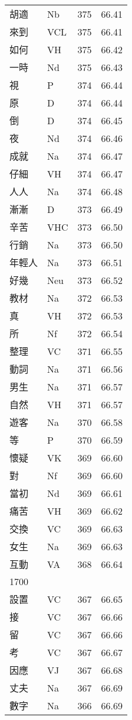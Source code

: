 \documentclass[twocolumn]{book}
\begin{document}
\begin{supertabular}{llrr}
胡適 & Nb & 375 &  66.41\\
來到 & VCL & 375 &  66.41\\
如何 & VH & 375 &  66.42\\
一時 & Nd & 375 &  66.43\\
視 & P & 374 &  66.44\\
原 & D & 374 &  66.44\\
倒 & D & 374 &  66.45\\
夜 & Nd & 374 &  66.46\\
成就 & Na & 374 &  66.47\\
仔細 & VH & 374 &  66.47\\
人人 & Na & 374 &  66.48\\
漸漸 & D & 373 &  66.49\\
辛苦 & VHC & 373 &  66.50\\
行銷 & Na & 373 &  66.50\\
年輕人 & Na & 373 &  66.51\\
好幾 & Neu & 373 &  66.52\\
教材 & Na & 372 &  66.53\\
真 & VH & 372 &  66.53\\
所 & Nf & 372 &  66.54\\
整理 & VC & 371 &  66.55\\
動詞 & Na & 371 &  66.56\\
男生 & Na & 371 &  66.57\\
自然 & VH & 371 &  66.57\\
遊客 & Na & 370 &  66.58\\
等 & P & 370 &  66.59\\
懷疑 & VK & 369 &  66.60\\
對 & Nf & 369 &  66.60\\
當初 & Nd & 369 &  66.61\\
痛苦 & VH & 369 &  66.62\\
交換 & VC & 369 &  66.63\\
女生 & Na & 369 &  66.63\\
互動 & VA & 368 &  66.64\\
1700\\
設置 & VC & 367 &  66.65\\
接 & VC & 367 &  66.66\\
留 & VC & 367 &  66.66\\
考 & VC & 367 &  66.67\\
因應 & VJ & 367 &  66.68\\
丈夫 & Na & 367 &  66.69\\
數字 & Na & 366 &  66.69\\

\end{supertabular}
\end{document}
